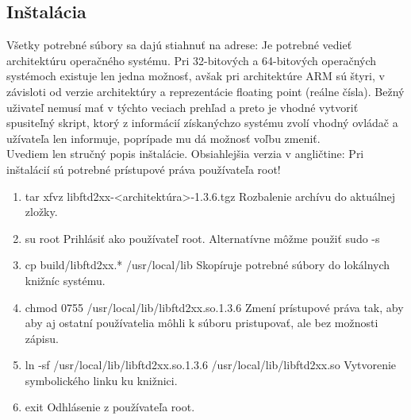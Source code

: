 \subsection{Inštalácia}
Všetky potrebné súbory sa dajú stiahnuť na adrese: \newline
 \mfdriver \newline
Je potrebné vedieť architektúru operačného systému. Pri 32-bitových a 64-bitových operačných systémoch existuje
len jedna možnosť, avšak pri architektúre ARM sú štyri, v závisloti od verzie architektúry a reprezentácie floating point 
(reálne čísla). Bežný uživateľ nemusí mať v týchto veciach prehľad a preto je vhodné vytvoriť spusiteľný skript, 
ktorý z informácií získanýchzo systému zvolí vhodný ovládač a užívateľa len informuje, poprípade mu dá možnosť 
voľbu zmeniť. 
\\ \newline
Uvediem len stručný popis inštalácie. Obsiahlejšia verzia v angličtine: \newline
 \mfinstall \newline
Pri inštalácií sú potrebné prístupové práva používateľa root!
\begin{enumerate}
\item tar xfvz libftd2xx-<architektúra>-1.3.6.tgz \newline
	Rozbalenie archívu do aktuálnej zložky.
\item su root \newline
	Prihlásiť ako používateľ root. Alternatívne môžme použiť sudo -s
\item cp build/libftd2xx.* /usr/local/lib \newline 
	Skopíruje potrebné súbory do lokálnych knižníc systému.
\item chmod 0755 /usr/local/lib/libftd2xx.so.1.3.6\newline 
	Zmení prístupové práva tak, aby aby aj ostatní používatelia môhli k súboru pristupovať, ale bez možnosti zápisu.
\item ln -sf /usr/local/lib/libftd2xx.so.1.3.6 /usr/local/lib/libftd2xx.so\newline 
	Vytvorenie symbolického linku ku knižnici.
\item exit \newline 
	Odhlásenie z používateľa root.
\end{enumerate}

